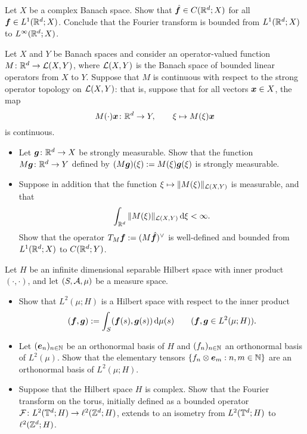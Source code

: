 \begin{exercise}\label{ex:FT-bounded-1-infty}
  Let $X$ be a complex Banach space.
  Show that $\hat{\bm{f}} \in C(\mathbb{R}^d;X)$ for all $\bm{f} \in L^1(\mathbb{R}^d;X)$.
  Conclude that the Fourier transform is bounded from $L^1(\mathbb{R}^d;X)$ to $L^\infty(\mathbb{R}^d;X)$.
\end{exercise}

\begin{exercise}
  Let $X$ and $Y$ be Banach spaces and consider an operator-valued function $M \colon \mathbb{R}^d \rightarrow \mathcal{L}(X,Y)$, where $\mathcal{L}(X,Y)$ is the Banach space of bounded linear operators from $X$ to $Y$.
  Suppose that $M$ is continuous with respect to the strong operator topology on $\mathcal{L}(X,Y)$: that is, suppose that for all vectors $\bm{x} \in X$, the map
  \begin{equation*}
    M(\cdot)\bm{x} \colon \mathbb{R}^d \rightarrow Y, \qquad \xi \mapsto M(\xi)\bm{x}
  \end{equation*}
  is continuous.
  \begin{itemize}
  \item
    Let $\bm{g} \colon \mathbb{R}^d \rightarrow X$ be strongly measurable.
    Show that the function $M\bm{g} \colon \mathbb{R}^d \rightarrow Y$ defined by $(M\bm{g})(\xi) := M(\xi)\bm{g}(\xi)$ is strongly measurable.
  \item
    Suppose in addition that the function $\xi \mapsto \|M(\xi)\|_{\mathcal{L}(X,Y)}$ is measurable, and that
    \begin{equation*}
      \int_{\mathbb{R}^d} \|M(\xi)\|_{\mathcal{L}(X,Y)} \, \mathrm{d} \xi < \infty.
    \end{equation*}
    Show that the operator $T_M\bm{f} := (M\hat{\bm{f}})^\vee$ is well-defined and bounded from $L^1(\mathbb{R}^d;X)$ to $C(\mathbb{R}^d;Y)$.
  \end{itemize}
\end{exercise}

\begin{exercise}
  Let $H$ be an infinite dimensional separable Hilbert space with inner product $(\cdot , \cdot)$, and let $(S,\mathcal{A},\mu)$ be a measure space.
  \begin{itemize}
  \item Show that $L^2(\mu;H)$ is a Hilbert space with respect to the inner product
    \begin{equation*}
      (\bm{f}, \bm{g}) := \int_{S} (\bm{f}(s), \bm{g}(s)) \, \mathrm{d}\mu(s) \qquad (\bm{f},\bm{g} \in L^2(\mu;H)).
    \end{equation*}
  \item Let $(\bm{e}_n)_{n \in \mathbb{N}}$ be an orthonormal basis of $H$ and $(f_n)_{n \in \mathbb{N}}$ an orthonormal basis of $L^2(\mu)$.
    Show that the elementary tensors $\{f_n \otimes \bm{e}_m : n,m \in \mathbb{N}\}$ are an orthonormal basis of $L^2(\mu;H)$.
  \item Suppose that the Hilbert space $H$ is complex.
    Show that the Fourier transform on the torus, initially defined as a bounded operator $\mathcal{F} \colon L^2(\mathbb{T}^d;H) \rightarrow \ell^2(\mathbb{Z}^d;H)$, extends to an isometry from $L^2(\mathbb{T}^d;H)$ to $\ell^2(\mathbb{Z}^d;H)$.
  \end{itemize}
\end{exercise}


